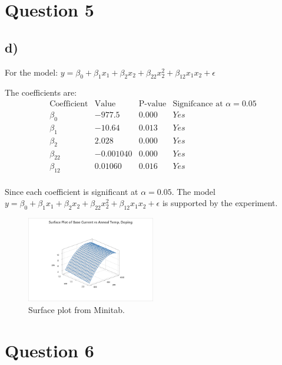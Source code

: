 \documentclass{article}
\begin{document}
\section*{Question 5}
\subsection*{d)}
For the model: $y = \beta_0 + \beta_1 x_1 + \beta_2 x_2 + \beta_{22} x^{2}_2 + \beta_{12} x_1 x_2 + \epsilon$

The coefficients are:
\begin{equation*}
    \begin{array}{c|c|c|c}
        \text{Coefficient} &\text{Value} &\text{P-value} &\text{Signifcance at } \alpha = 0.05 \\
        \hline
        \beta_0  & -977.5     & 0.000 & Yes\\
        \beta_1  & -10.64     & 0.013 & Yes\\
        \beta_2  & 2.028      & 0.000 & Yes\\
        \beta_22 & -0.001040  & 0.000 & Yes\\
        \beta_12 & 0.01060    & 0.016 & Yes
    
    \end{array}
    \end{equation*}\\

Since each coefficient is significant at $\alpha = 0.05$.
The model $y = \beta_0 + \beta_1 x_1 + \beta_2 x_2 + \beta_{22} x^{2}_2 + \beta_{12} x_1 x_2 + \epsilon$ is supported by the experiment.

\begin{figure}[h]
    \centering
    \includegraphics[width=0.5\textwidth]{./images/5_d.png}
    \caption{Surface plot from Minitab.}
    \label{fig:3_b_2}
\end{figure}

\section*{Question 6}
\end{document}
